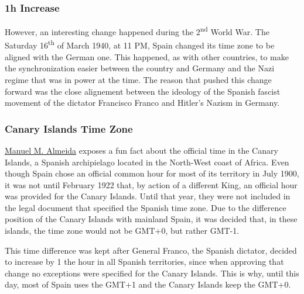 \documentclass[../my_knowledge.tex]{subfiles}
\begin{document}
\subsubsection{1h Increase}
However, an interesting change happened during the 2\textsuperscript{nd} World War. The Saturday 16\textsuperscript{th} of March 1940\cite{spanish_timezone_change}, at 11 PM, Spain changed its time zone to be aligned with the German one. This happened, as with other countries, to make the synchronization easier between the country and Germany and the Nazi regime that was in power at the time. The reason that pushed this change forward was the close alignement between the ideology of the Spanish fascist movement of the dictator Francisco Franco and Hitler's Nazism in Germany.

\subsubsection{Canary Islands Time Zone}
\href{https://mangasverdes.es/2013/11/07/origen-hora-oficial-de-canarias/}{Manuel M. Almeida}\cite{canary_timezone} exposes a fun fact about the official time in the Canary Islands, a Spanish archipielago located in the North-West coast of Africa. Even though Spain chose an official common hour for most of its territory in July 1900, it was not until February 1922 that, by action of a different King, an official hour was provided for the Canary Islands. Until that year, they were not included in the legal document that specified the Spanish time zone. Due to the difference position of the Canary Islands with mainland Spain, it was decided that, in these islands, the time zone would not be GMT+0, but rather GMT-1.

This time difference was kept after General Franco, the Spanish dictator, decided to increase by 1 the hour in all Spanish territories, since when approving that change no exceptions were specified for the Canary Islands. This is why, until this day, most of Spain uses the GMT+1 and the Canary Islands keep the GMT+0.
\end{document}
